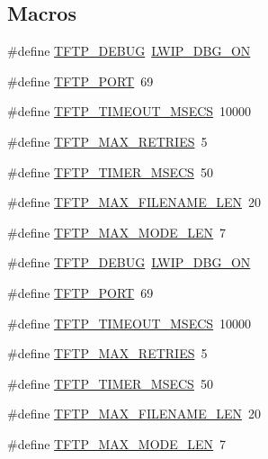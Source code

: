 \subsection*{Macros}
\begin{DoxyCompactItemize}
\item 
\#define \hyperlink{group__tftp__opts_ga2dd54a1d0c3006527b8a7a8604b81981}{T\+F\+T\+P\+\_\+\+D\+E\+B\+UG}~\hyperlink{group__debugging__levels_ga9e31b7cbbc8f46af8e62b548079acd4e}{L\+W\+I\+P\+\_\+\+D\+B\+G\+\_\+\+ON}
\item 
\#define \hyperlink{group__tftp__opts_gad9230620a5d3bb87a7ac280ff99875d1}{T\+F\+T\+P\+\_\+\+P\+O\+RT}~69
\item 
\#define \hyperlink{group__tftp__opts_ga36986e5465dc2ccb6184fc57f9a37d63}{T\+F\+T\+P\+\_\+\+T\+I\+M\+E\+O\+U\+T\+\_\+\+M\+S\+E\+CS}~10000
\item 
\#define \hyperlink{group__tftp__opts_ga6a01757ad942eb602e8a87e2be42d313}{T\+F\+T\+P\+\_\+\+M\+A\+X\+\_\+\+R\+E\+T\+R\+I\+ES}~5
\item 
\#define \hyperlink{group__tftp__opts_ga3e6caacb3f4d43f780b2d68ffe4258ea}{T\+F\+T\+P\+\_\+\+T\+I\+M\+E\+R\+\_\+\+M\+S\+E\+CS}~50
\item 
\#define \hyperlink{group__tftp__opts_ga8e975900b4397313f1a649ff76a3063b}{T\+F\+T\+P\+\_\+\+M\+A\+X\+\_\+\+F\+I\+L\+E\+N\+A\+M\+E\+\_\+\+L\+EN}~20
\item 
\#define \hyperlink{group__tftp__opts_gaa8a449c25e37be757f5efccd422c9055}{T\+F\+T\+P\+\_\+\+M\+A\+X\+\_\+\+M\+O\+D\+E\+\_\+\+L\+EN}~7
\item 
\#define \hyperlink{group__tftp__opts_ga2dd54a1d0c3006527b8a7a8604b81981}{T\+F\+T\+P\+\_\+\+D\+E\+B\+UG}~\hyperlink{group__debugging__levels_ga9e31b7cbbc8f46af8e62b548079acd4e}{L\+W\+I\+P\+\_\+\+D\+B\+G\+\_\+\+ON}
\item 
\#define \hyperlink{group__tftp__opts_gad9230620a5d3bb87a7ac280ff99875d1}{T\+F\+T\+P\+\_\+\+P\+O\+RT}~69
\item 
\#define \hyperlink{group__tftp__opts_ga36986e5465dc2ccb6184fc57f9a37d63}{T\+F\+T\+P\+\_\+\+T\+I\+M\+E\+O\+U\+T\+\_\+\+M\+S\+E\+CS}~10000
\item 
\#define \hyperlink{group__tftp__opts_ga6a01757ad942eb602e8a87e2be42d313}{T\+F\+T\+P\+\_\+\+M\+A\+X\+\_\+\+R\+E\+T\+R\+I\+ES}~5
\item 
\#define \hyperlink{group__tftp__opts_ga3e6caacb3f4d43f780b2d68ffe4258ea}{T\+F\+T\+P\+\_\+\+T\+I\+M\+E\+R\+\_\+\+M\+S\+E\+CS}~50
\item 
\#define \hyperlink{group__tftp__opts_ga8e975900b4397313f1a649ff76a3063b}{T\+F\+T\+P\+\_\+\+M\+A\+X\+\_\+\+F\+I\+L\+E\+N\+A\+M\+E\+\_\+\+L\+EN}~20
\item 
\#define \hyperlink{group__tftp__opts_gaa8a449c25e37be757f5efccd422c9055}{T\+F\+T\+P\+\_\+\+M\+A\+X\+\_\+\+M\+O\+D\+E\+\_\+\+L\+EN}~7
\end{DoxyCompactItemize}


